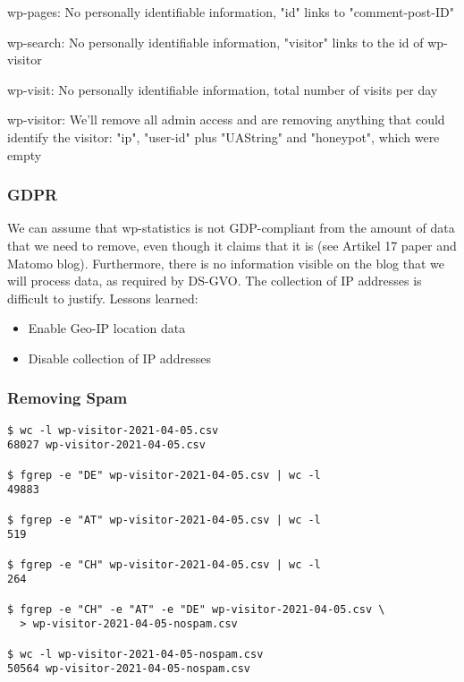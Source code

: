 wp-pages: No personally identifiable information, "id" links to "comment-post-ID"

wp-search: No personally identifiable information, "visitor" links to the id of wp-visitor

wp-visit: No personally identifiable information, total number of visits per day

wp-visitor: We'll remove all admin access and are removing anything that could identify the visitor: "ip", "user-id" plus "UAString" and "honeypot", which were empty

\subsubsection{GDPR}

We can assume that wp-statistics is not GDP-compliant from the amount of data that we need to remove, even though it claims that it is (see Artikel 17 paper and Matomo blog). Furthermore, there is no information visible on the blog that we will process data, as required by DS-GVO. The collection of IP addresses is difficult to justify. Lessons learned:

\begin{itemize}
 \item Enable Geo-IP location data
 \item Disable collection of IP addresses
\end{itemize}

\subsubsection{Removing Spam}

\begin{lstlisting}[caption=Removing Spam, frame=single, basicstyle=\ttfamily]
$ wc -l wp-visitor-2021-04-05.csv
68027 wp-visitor-2021-04-05.csv

$ fgrep -e "DE" wp-visitor-2021-04-05.csv | wc -l
49883

$ fgrep -e "AT" wp-visitor-2021-04-05.csv | wc -l
519

$ fgrep -e "CH" wp-visitor-2021-04-05.csv | wc -l
264

$ fgrep -e "CH" -e "AT" -e "DE" wp-visitor-2021-04-05.csv \
  > wp-visitor-2021-04-05-nospam.csv

$ wc -l wp-visitor-2021-04-05-nospam.csv 
50564 wp-visitor-2021-04-05-nospam.csv

\end{lstlisting}

